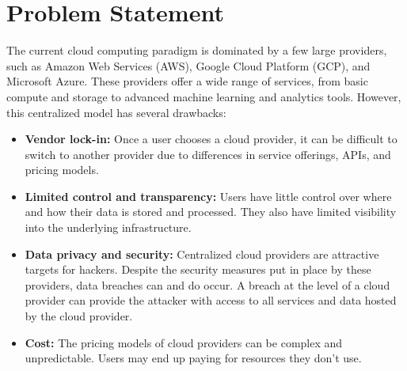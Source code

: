 \section{Problem Statement}
\label{sec:problem_statement}

The current cloud computing paradigm is dominated by a few large providers, such as Amazon Web Services (AWS), Google Cloud Platform (GCP), and Microsoft Azure. These providers offer a wide range of services, from basic compute and storage to advanced machine learning and analytics tools. However, this centralized model has several drawbacks:

\begin{itemize}
    \item \textbf{Vendor lock-in:} Once a user chooses a cloud provider, it can be difficult to switch to another provider due to differences in service offerings, APIs, and pricing models.
    \item \textbf{Limited control and transparency:} Users have little control over where and how their data is stored and processed. They also have limited visibility into the underlying infrastructure.
    \item \textbf{Data privacy and security:} Centralized cloud providers are attractive targets for hackers. Despite the security measures put in place by these providers, data breaches can and do occur. A breach at the level of a cloud provider can provide the attacker with access to all services and data hosted by the cloud provider.
    \item \textbf{Cost:} The pricing models of cloud providers can be complex and unpredictable. Users may end up paying for resources they don't use.
\end{itemize}
